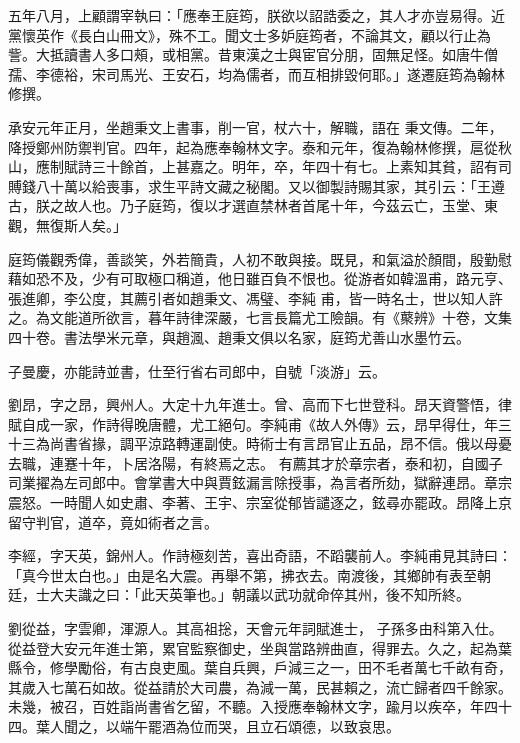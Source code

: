 \begin{pinyinscope}
 五年八月，上顧謂宰執曰：「應奉王庭筠，朕欲以詔誥委之，其人才亦豈易得。近黨懷英作《長白山冊文》，殊不工。聞文士多妒庭筠者，不論其文，顧以行止為訾。大抵讀書人多口頰，或相黨。昔東漢之士與宦官分朋，固無足怪。如唐牛僧孺、李德裕，宋司馬光、王安石，均為儒者，而互相排毀何耶。」遂遷庭筠為翰林修撰。



 承安元年正月，坐趙秉文上書事，削一官，杖六十，解職，語在
 秉文傳。二年，降授鄭州防禦判官。四年，起為應奉翰林文字。泰和元年，復為翰林修撰，扈從秋山，應制賦詩三十餘首，上甚嘉之。明年，卒，年四十有七。上素知其貧，詔有司賻錢八十萬以給喪事，求生平詩文藏之秘閣。又以御製詩賜其家，其引云：「王遵古，朕之故人也。乃子庭筠，復以才選直禁林者首尾十年，今茲云亡，玉堂、東觀，無復斯人矣。」



 庭筠儀觀秀偉，善談笑，外若簡貴，人初不敢與接。既見，和氣溢於顏間，殷勤慰藉如恐不及，少有可取極口稱道，他日雖百負不恨也。從游者如韓溫甫，路元亨、張進卿，李公度，其薦引者如趙秉文、馮璧、李純
 甫，皆一時名士，世以知人許之。為文能道所欲言，暮年詩律深嚴，七言長篇尤工險韻。有《藂辨》十卷，文集四十卷。書法學米元章，與趙渢、趙秉文俱以名家，庭筠尤善山水墨竹云。



 子曼慶，亦能詩並書，仕至行省右司郎中，自號「淡游」云。



 劉昂，字之昂，興州人。大定十九年進士。曾、高而下七世登科。昂天資警悟，律賦自成一家，作詩得晚唐體，尤工絕句。李純甫《故人外傳》云，昂早得仕，年三十三為尚書省掾，調平涼路轉運副使。時術士有言昂官止五品，昂不信。俄以母憂去職，連蹇十年，卜居洛陽，有終焉之志。
 有薦其才於章宗者，泰和初，自國子司業擢為左司郎中。會掌書大中與賈鉉漏言除授事，為言者所劾，獄辭連昂。章宗震怒。一時聞人如史肅、李著、王宇、宗室從郁皆譴逐之，鉉尋亦罷政。昂降上京留守判官，道卒，竟如術者之言。



 李經，字天英，錦州人。作詩極刻苦，喜出奇語，不蹈襲前人。李純甫見其詩曰：「真今世太白也。」由是名大震。再舉不第，拂衣去。南渡後，其鄉帥有表至朝廷，士大夫識之曰：「此天英筆也。」朝議以武功就命倅其州，後不知所終。



 劉從益，字雲卿，渾源人。其高祖捴，天會元年詞賦進士，
 子孫多由科第入仕。從益登大安元年進士第，累官監察御史，坐與當路辨曲直，得罪去。久之，起為葉縣令，修學勵俗，有古良吏風。葉自兵興，戶減三之一，田不毛者萬七千畝有奇，其歲入七萬石如故。從益請於大司農，為減一萬，民甚賴之，流亡歸者四千餘家。未幾，被召，百姓詣尚書省乞留，不聽。入授應奉翰林文字，踰月以疾卒，年四十四。葉人聞之，以端午罷酒為位而哭，且立石頌德，以致哀思。




\end{pinyinscope}
